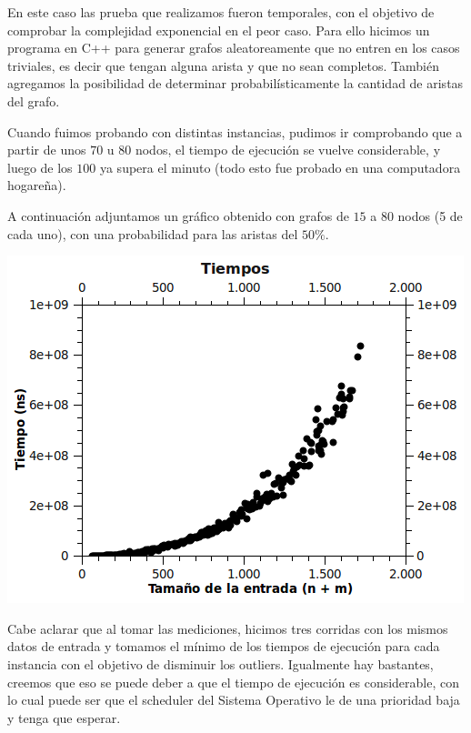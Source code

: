 En este caso las prueba que realizamos fueron temporales, con el objetivo de comprobar la complejidad exponencial en el peor caso. Para ello hicimos un programa en C++ para generar grafos aleatoreamente que no entren en los casos triviales, es decir que tengan alguna arista y que no sean completos. También agregamos la posibilidad de determinar probabilísticamente la cantidad de aristas del grafo.

Cuando fuimos probando con distintas instancias, pudimos ir comprobando que a partir de unos $70$ u $80$ nodos, el tiempo de ejecución se vuelve considerable, y luego de los $100$ ya supera el minuto (todo esto fue probado en una computadora hogareña).

A continuación adjuntamos un gráfico obtenido con grafos de $15$ a $80$ nodos (5 de cada uno), con una probabilidad para las aristas del $50\%$.

\begin{center}
\includegraphics[scale=0.75]{img/exacto-tiempos.png} 
\end{center}

Cabe aclarar que al tomar las mediciones, hicimos tres corridas con los mismos datos de entrada y tomamos el mínimo de los tiempos de ejecución para cada instancia con el objetivo de disminuir los outliers. Igualmente hay bastantes, creemos que eso se puede deber a que el tiempo de ejecución es considerable, con lo cual puede ser que el scheduler del Sistema Operativo le de una prioridad baja y tenga que esperar.
